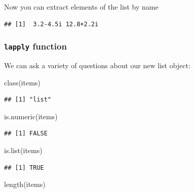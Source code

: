 \documentclass[
]{book}
\newenvironment{Shaded}{\begin{snugshade}}{\end{snugshade}}
\newcommand{\FunctionTok}[1]{\textcolor[rgb]{0.00,0.00,0.00}{#1}}
\newcommand{\NormalTok}[1]{#1}
\newcommand{\SpecialCharTok}[1]{\textcolor[rgb]{0.00,0.00,0.00}{#1}}
\theoremstyle{definition}
\theoremstyle{definition}
\theoremstyle{definition}
\theoremstyle{definition}
\theoremstyle{remark}
\begin{document}
Now you can extract elements of the list by name

\begin{Shaded}
\end{Shaded}

\begin{verbatim}
## [1]  3.2-4.5i 12.8+2.2i
\end{verbatim}

\hypertarget{lapply-function}{%
\subsubsection{\texorpdfstring{\texttt{lapply} function}{lapply function}}\label{lapply-function}}

We can ask a variety of questions about our new list object:

\begin{Shaded}
\begin{Highlighting}[]
\FunctionTok{class}\NormalTok{(items)}
\end{Highlighting}
\end{Shaded}

\begin{verbatim}
## [1] "list"
\end{verbatim}

\begin{Shaded}
\begin{Highlighting}[]
\FunctionTok{is.numeric}\NormalTok{(items)}
\end{Highlighting}
\end{Shaded}

\begin{verbatim}
## [1] FALSE
\end{verbatim}

\begin{Shaded}
\begin{Highlighting}[]
\FunctionTok{is.list}\NormalTok{(items)}
\end{Highlighting}
\end{Shaded}

\begin{verbatim}
## [1] TRUE
\end{verbatim}

\begin{Shaded}
\begin{Highlighting}[]
\FunctionTok{length}\NormalTok{(items)}
\end{Highlighting}
\end{Shaded}
\end{document}
